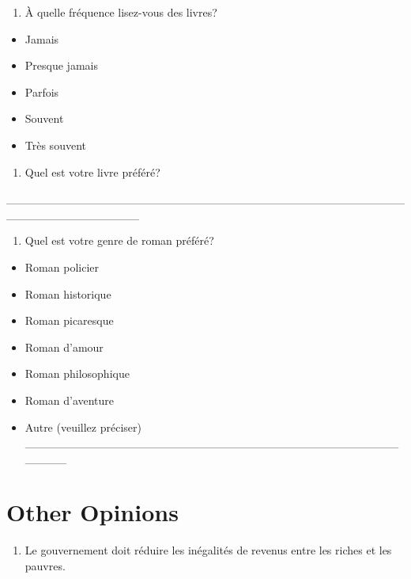 \documentclass[
  letterpaper,
  DIV=11,
  numbers=noendperiod]{scrreprt}
\providecommand{\tightlist}{%
  \setlength{\itemsep}{0pt}\setlength{\parskip}{0pt}}\usepackage{longtable,booktabs,array}
\begin{document}
\begin{enumerate}
\def\labelenumi{\arabic{enumi}.}
\setcounter{enumi}{55}
\tightlist
\item
  À quelle fréquence lisez-vous des livres?
\end{enumerate}

\begin{itemize}
\tightlist
\item
  Jamais
\item
  Presque jamais
\item
  Parfois
\item
  Souvent
\item
  Très souvent
\end{itemize}

\begin{enumerate}
\def\labelenumi{\arabic{enumi}.}
\setcounter{enumi}{56}
\tightlist
\item
  Quel est votre livre préféré?
\end{enumerate}

\_\_\_\_\_\_\_\_\_\_\_\_\_\_\_\_\_\_\_\_\_\_\_\_\_\_\_\_\_\_\_\_\_\_\_\_\_\_\_\_\_\_\_\_\_\_\_\_\_\_\_\_\_\_\_\_\_\_\_\_\_\_\_\_

\begin{enumerate}
\def\labelenumi{\arabic{enumi}.}
\setcounter{enumi}{57}
\tightlist
\item
  Quel est votre genre de roman préféré?
\end{enumerate}

\begin{itemize}
\tightlist
\item
  Roman policier
\item
  Roman historique
\item
  Roman picaresque
\item
  Roman d'amour
\item
  Roman philosophique
\item
  Roman d'aventure
\item
  Autre (veuillez préciser)
  \_\_\_\_\_\_\_\_\_\_\_\_\_\_\_\_\_\_\_\_\_\_\_\_\_\_\_\_\_\_\_\_\_\_\_\_\_\_\_\_\_\_\_\_\_\_\_\_\_\_
\end{itemize}

\hypertarget{other-opinions}{%
\section{Other Opinions}\label{other-opinions}}

\begin{enumerate}
\def\labelenumi{\arabic{enumi}.}
\setcounter{enumi}{58}
\tightlist
\item
  Le gouvernement doit réduire les inégalités de revenus entre les
  riches et les pauvres.
\end{enumerate}
\end{document}

